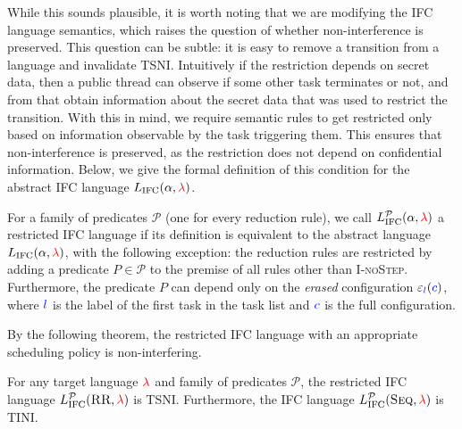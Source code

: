 \documentclass{llncs}
\newcommand{\Red}[1]{{\color{red} #1}}
\begin{document}
While this sounds plausible, it is worth noting that we are modifying the IFC language semantics,
which raises the question of whether non-interference is preserved.
This question can be subtle: it is easy to remove a transition from
a language and invalidate TSNI.  Intuitively
if the restriction depends on secret data, then a public thread
can observe if some other task terminates or not, and from that obtain
information about the secret data that was used to restrict the
transition.
With this in mind, we require semantic rules to get restricted only
based on information observable by the task triggering them.
This ensures that non-interference is preserved, as the
restriction does not depend on confidential information.
Below, we give the formal definition of this condition for the
abstract IFC language \ensuremath{L_\text{IFC}(\alpha,\Red{\lambda})}.














\begin{definition}
  \label{def:restricted}
  For a family of predicates $\mathcal P$ (one for every reduction
  rule), we call
  \ensuremath{L_\text{IFC}^{\mathcal{P}}(\alpha,\Red{\lambda})} a restricted IFC language
  if its definition is equivalent to the abstract language
  \ensuremath{L_\text{IFC}(\alpha,\Red{\lambda})}, with the following exception:
  the reduction rules are restricted
  by adding a predicate $P \in \mathcal P$ to the premise of
  all rules other than \textsc{I-noStep}.  Furthermore, the predicate $P$
  can depend only on the \textit{erased} configuration
  \ensuremath{\varepsilon_{\ifc{l}}(\ifc{c})}, where \ensuremath{\ifc{l}} is the label of the first task
  in the task list and \ensuremath{\ifc{c}} is the full configuration.
\end{definition}

By the following theorem, the restricted IFC language with an
appropriate scheduling policy is non-interfering.

\begin{theorem}
  \label{thm:restricted}
  For any target language \ensuremath{\Red{\lambda}} and family of predicates
  $\mathcal{P}$, the restricted IFC language \ensuremath{L_\text{IFC}^{\mathcal{P}}(\textsc{RR},\Red{\lambda})}
  is TSNI.  Furthermore, the IFC language
  \ensuremath{L_\text{IFC}^{\mathcal{P}}(\textsc{Seq},\Red{\lambda})} is TINI.
\end{theorem}
\end{document}
